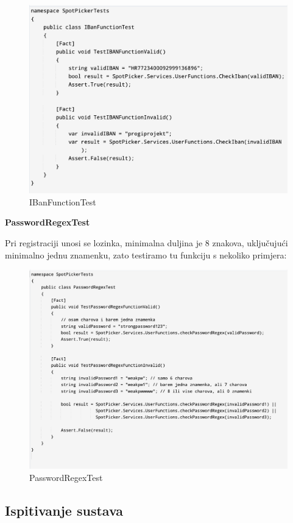 			\begin{figure}[hbt!]
				\centering
				\includegraphics[width=0.7\linewidth]{slike/kod2.png}
				\caption{IBanFunctionTest}
				\label{fig:kod2}
			\end{figure}
			
			
			\textbf{PasswordRegexTest}
			
			{Pri registraciji unosi se lozinka, minimalna duljina je 8 znakova, uključujući minimalno jednu znamenku, zato testiramo tu funkciju s nekoliko primjera:}
			
			
			
			
			\begin{figure}[hbt!]
				\centering
				\includegraphics[width=0.7\linewidth]{slike/kod3.png}
				\caption{PasswordRegexTest}
				\label{fig:kod3}
			\end{figure}
			
			
			
		
			
			
			
			
			\subsection{Ispitivanje sustava}
			
